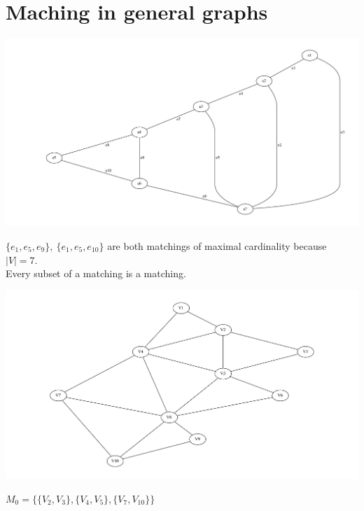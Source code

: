 \section{Maching in general graphs}
\label{sec:Matching in general graphs}
 \begin{example*}
\includegraphics[scale=0.35]{diagrams/Chapter4_Example1.pdf}\\
\end{example*}
$\{e_{1}, e_{5}, e_{9}\}, \: \{ e_{1}, e_{5}, e_{10}\}$ are both matchings of
maximal cardinality because $|V|=7$.\\
Every subset of a matching is a matching.
\begin{example*}
\includegraphics[scale=0.35]{diagrams/Chapter4_Example6.pdf}\\
\end{example*}
$M_0=\{\{V_{2}, V_{3}\}, \{V_{4}, V_{5}\}, \{V_{7}, V_{10}\}\}$
